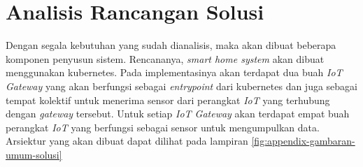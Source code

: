 \section{Analisis Rancangan Solusi}
\label{sec:rancangan-solusi}

Dengan segala kebutuhan yang sudah dianalisis, maka akan dibuat beberapa komponen penyusun sistem. Rencananya, \textit{smart home system} akan dibuat menggunakan kubernetes. Pada implementasinya akan terdapat dua buah \textit{IoT Gateway} yang akan berfungsi sebagai \textit{entrypoint} dari kubernetes dan juga sebagai tempat kolektif untuk menerima sensor dari perangkat \textit{IoT} yang terhubung dengan \textit{gateway} tersebut. Untuk setiap \textit{IoT Gateway} akan terdapat empat buah perangkat \textit{IoT} yang berfungsi sebagai sensor untuk mengumpulkan data. Arsiektur yang akan dibuat dapat dilihat pada lampiran \ref{fig:appendix-gambaran-umum-solusi}